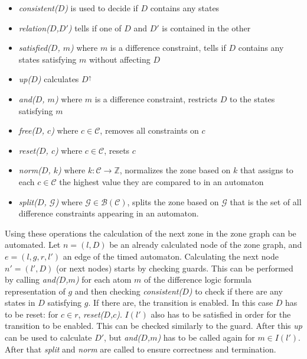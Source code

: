 \begin{itemize}
	\item \emph{consistent($D$)} is used to decide if $D$ contains any states
	\item \emph{relation($D$,$D'$)} tells if one of $D$ and $D'$ is contained in the other 
	\item \emph{satisfied($D$, $m$)} where $m$ is a difference constraint, tells if $D$ contains any states satisfying $m$ without affecting $D$
	\item \emph{up($D$)} calculates $D^\uparrow$
	 \item \emph{and($D$, $m$)} where $m$ is a difference constraint, restricts $D$ to the states satisfying $m$
	 \item \emph{free($D$, $c$)} where $c \in \mathcal{C}$,  removes all constraints on $c$
	 \item \emph{reset($D$, $c$)} where $c \in \mathcal{C}$, resets $c$
	 \item \emph{norm($D$, $k$)} where $k:\mathcal{C} \to \mathds{Z}$, normalizes the zone based on $k$ that assigns to each $c \in \mathcal{C}$ the highest value they are compared to in an automaton
	 \item \emph{split($D$, $\mathcal{G}$)} where $\mathcal{G} \in \mathcal{B}(\mathcal{C})$, splits the zone based on $\mathcal{G}$ that is the set of all difference constraints appearing in an automaton.
\end{itemize}

Using these operations the calculation of the next zone in the zone graph can be automated. Let $n=(l,D)$ be an already calculated node of the zone graph, and $e=(l,g,r,l')$ an edge of the timed automaton. Calculating the next node $n'=(l',D)$ (or next nodes) starts by checking guards. This can be performed by calling \emph{and($D$,$m$)} for each atom $m$ of the difference logic formula representation of $g$ and then checking \emph{consistent($D$)} to check if there are any states in $D$ satisfying $g$. If there are, the transition is enabled. In this case $D$ has to be reset: for $c \in r$, \emph{reset($D$,$c$)}. $I(l')$ also has to be satisfied in order for the transition to be enabled. This can be checked similarly to the guard. After this \emph{up} can be used to calculate $D'$, but \emph{and($D$,$m$)} has to be called again for $m \in I(l')$. After that \emph{split} and \emph{norm} are called to ensure correctness and termination.

